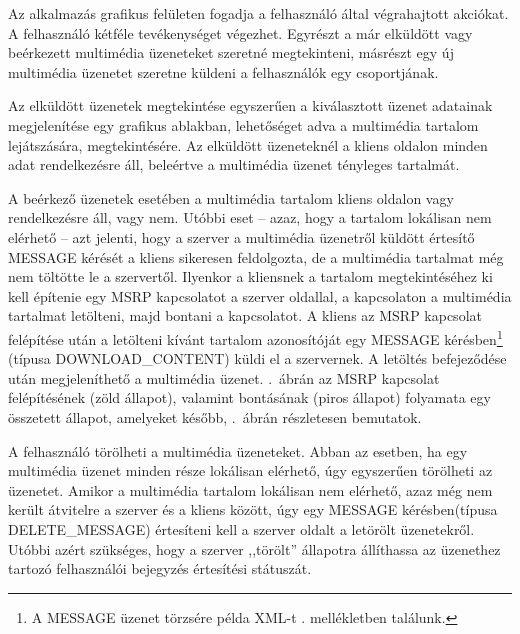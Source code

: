 Az alkalmazás grafikus felületen fogadja a felhasználó által végrahajtott akciókat. A felhasználó kétféle tevékenységet végezhet. Egyrészt a már elküldött vagy beérkezett multimédia üzeneteket szeretné megtekinteni, másrészt egy új multimédia üzenetet szeretne küldeni a felhasználók egy csoportjának. 

Az elküldött üzenetek megtekintése egyszerűen a kiválasztott üzenet adatainak megjelenítése egy grafikus ablakban, lehetőséget adva a multimédia tartalom lejátszására, megtekintésére. Az elküldött üzeneteknél a kliens oldalon minden adat rendelkezésre áll, beleértve a multimédia üzenet tényleges tartalmát.

A beérkező üzenetek esetében a multimédia tartalom kliens oldalon vagy rendelkezésre áll, vagy nem. Utóbbi eset -- azaz, hogy a tartalom lokálisan nem elérhető -- azt jelenti, hogy a szerver a multimédia üzenetről küldött értesítő MESSAGE kérését a kliens sikeresen feldolgozta, de a multimédia tartalmat még nem töltötte le a szervertől. Ilyenkor a kliensnek a tartalom megtekintéséhez ki kell építenie egy MSRP kapcsolatot a szerver oldallal, a kapcsolaton a multimédia tartalmat letölteni, majd bontani a kapcsolatot. A kliens az MSRP kapcsolat felépítése után a letölteni kívánt tartalom azonosítóját egy MESSAGE kérésben\footnote{A MESSAGE üzenet törzsére példa XML-t . mellékletben találunk.} (típusa DOWNLOAD\_CONTENT) küldi el a szervernek. A letöltés befejeződése után megjeleníthető a multimédia üzenet. .~ábrán az MSRP kapcsolat felépítésének (zöld állapot), valamint bontásának (piros állapot) folyamata egy összetett állapot, amelyeket később, .~ábrán részletesen bemutatok.

A felhasználó törölheti a multimédia üzeneteket. Abban az esetben, ha egy multimédia üzenet minden része lokálisan elérhető, úgy egyszerűen törölheti az üzenetet. Amikor a multimédia tartalom lokálisan nem elérhető, azaz még nem került átvitelre a szerver és a kliens között, úgy egy MESSAGE kérésben\footnotemark[4] (típusa DELETE\_MESSAGE) értesíteni kell a szerver oldalt a letörölt üzenetekről. Utóbbi azért szükséges, hogy a szerver ,,törölt'' állapotra állíthassa az üzenethez tartozó felhasználói bejegyzés értesítési státuszát. 
 
